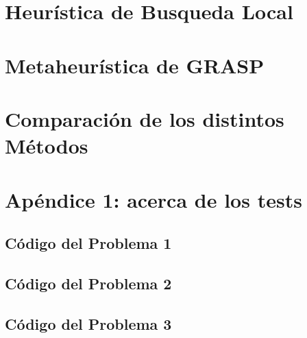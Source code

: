 \documentclass[a4paper]{article}
\begin{document}
\newpage
\section{Heurística de Busqueda Local}


\newpage
\section{Metaheurística de GRASP}


\newpage
\section{Comparación de los distintos Métodos}


\newpage
\section{Apéndice 1: acerca de los tests}


\subsection{Código del Problema 1}

\subsection{Código del Problema 2}



\subsection{Código del Problema 3}
\end{document}
